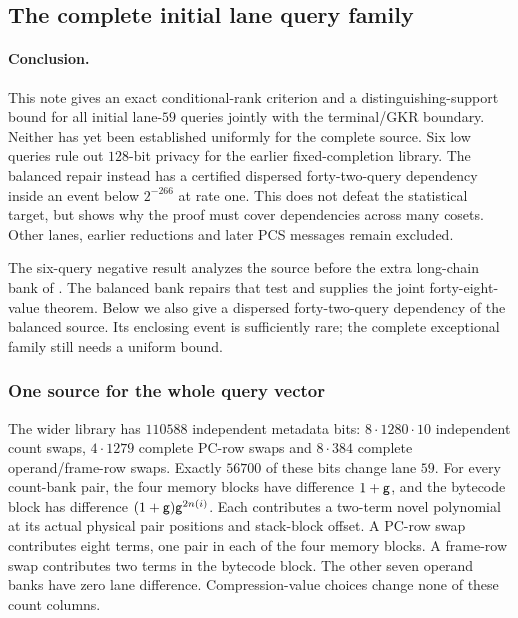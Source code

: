 \subsection{The complete initial lane query family}\label{note:zk-flock-query-fiber}

\paragraph{Conclusion.} This note gives an exact conditional-rank criterion and a distinguishing-support bound for all initial lane-$59$ queries jointly with the terminal/GKR boundary. Neither has yet been established uniformly for the complete source. Six low queries rule out $128$-bit privacy for the earlier fixed-completion library. The balanced repair instead has a certified dispersed forty-two-query dependency inside an event below $2^{-266}$ at rate one. This does not defeat the statistical target, but shows why the proof must cover dependencies across many cosets. Other lanes, earlier reductions and later PCS messages remain excluded.

The six-query negative result analyzes the source before the extra long-chain bank of . The balanced bank repairs that test and supplies the joint forty-eight-value theorem. Below we also give a dispersed forty-two-query dependency of the balanced source. Its enclosing event is sufficiently rare; the complete exceptional family still needs a uniform bound.

\subsubsection{One source for the whole query vector}

The wider library has $110588$ independent metadata bits: $8\cdot1280\cdot10$ independent count swaps, $4\cdot1279$ complete PC-row swaps and $8\cdot384$ complete operand/frame-row swaps. Exactly $56700$ of these bits change lane $59$. For every count-bank pair, the four memory blocks have difference $1+\mathsf{g}$, and the bytecode block has difference $(1+\mathsf{g})\mathsf{g}^{2n(i)}$. Each contributes a two-term novel polynomial at its actual physical pair positions and stack-block offset. A PC-row swap contributes eight terms, one pair in each of the four memory blocks. A frame-row swap contributes two terms in the bytecode block. The other seven operand banks have zero lane difference. Compression-value choices change none of these count columns.

